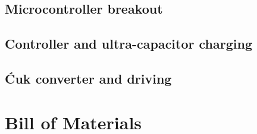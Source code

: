 \subsection{Microcontroller breakout}

\subsection{Controller and ultra-capacitor charging}

\subsection{\'Cuk converter and driving}

\newpage

\clearpage
\section{Bill of Materials}
\begin{figure}[H]
    \centering
    \label{}
\end{figure}
\clearpage
